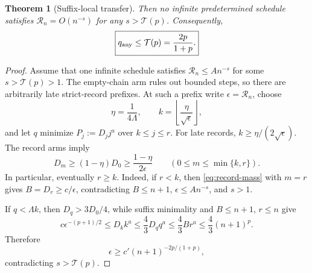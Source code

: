 \documentclass[11pt]{article}
\newtheorem{theorem}{Theorem}[section]
\theoremstyle{remark}
\newcommand{\Risk}{\mathcal R}
\newcommand{\Transfer}{\mathcal T}
\begin{document}
\begin{theorem}[Suffix-local transfer]
Then no infinite predetermined schedule satisfies
\(\Risk_n=O(n^{-s})\) for any \(s>\Transfer(p)\).  Consequently,
\begin{equation}
 \boxed{q_{\rm any}\le\Transfer(p)=\frac{2p}{1+p}.}
 \label{eq:transfer}
\end{equation}
\end{theorem}

\begin{proof}
Assume that one infinite schedule satisfies
\(\Risk_n\le A n^{-s}\) for some \(s>\Transfer(p)>1\).  The empty-chain
arm rules out bounded steps, so there are arbitrarily late strict-record
prefixes.  At such a prefix write \(\epsilon=\Risk_n\), choose
\[
 \eta=\frac1{4\Lambda},
 \qquad
 k=\left\lfloor\frac{\eta}{\sqrt\epsilon}\right\rfloor,
\]
and let \(q\) minimize \(P_j:=D_jj^a\) over \(k\le j\le r\).
For late records, \(k\ge\eta/(2\sqrt\epsilon)\).  The record arms imply
\begin{equation}
 D_m\ge(1-\eta)D_0\ge\frac{1-\eta}{2\epsilon}
 \qquad(0\le m\le\min\{k,r\}).
 \label{eq:record-mass}
\end{equation}
In particular, eventually \(r\ge k\).
Indeed, if \(r<k\), then \eqref{eq:record-mass} with \(m=r\) gives
\(B=D_r\ge c/\epsilon\), contradicting \(B\le n+1\),
\(\epsilon\le An^{-s}\), and \(s>1\).

If \(q<\Lambda k\), then \(D_q>3D_0/4\), while suffix minimality and
\(B\le n+1\), \(r\le n\) give
\[
 c\epsilon^{-(p+1)/2}
 \le D_kk^a
 \le\frac43D_qq^a
 \le\frac43Br^a
 \le\frac43(n+1)^p.
\]
Therefore
\[
 \epsilon\ge c'(n+1)^{-2p/(1+p)},
\]
contradicting \(s>\Transfer(p)\).


\end{proof}
\end{document}
